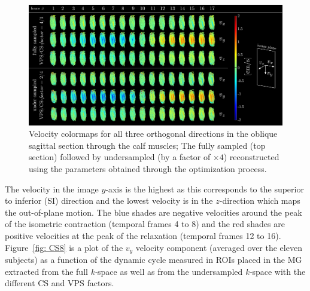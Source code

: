 \begin{figure}
\vspace{+0.2cm}
\centering
\includegraphics[width=8.5in]{Figures/CS1_12.pdf}
\captionsetup{width=8.5in}
\caption[Velocity colormaps for all three orthogonal directions in the oblique sagittal section through the calf muscles]{Velocity colormaps for all three orthogonal directions in the oblique sagittal section through the calf muscles; The fully sampled (top section) followed by undersampled (by a factor of $\times 4$) reconstructed using the parameters obtained through the optimization process.}
\label{fig: CS7}
\end{figure}
The velocity in the image $y$-axis is the highest as this corresponds to the superior to inferior (SI) direction and the lowest velocity is in the $z$-direction which maps the out-of-plane motion. 
The blue shades are negative velocities around the peak of the isometric contraction (temporal frames 4 to 8) and the red shades are positive velocities at the peak of the relaxation (temporal frames 12 to 16).
Figure~\ref{fig: CS8} is a plot of the $v_y$ velocity component (averaged over the eleven subjects) as a function of the dynamic cycle measured in ROIs placed in the MG extracted from the full \mbox{\textit{k-}space} as well as from the undersampled \mbox{\textit{k-}space} with the different CS and VPS factors.
